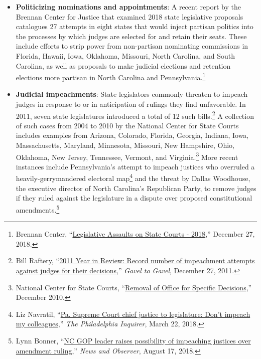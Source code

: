 \documentclass[12pt]{article}
\begin{document}
\begin{itemize}

\item \textbf{Politicizing nominations and appointments}: A recent report by the Brennan Center for Justice that examined 2018 state legislative proposals catalogues 27 attempts in eight states that would inject partisan politics into the processes by which judges are selected for and retain their seats. These include efforts to strip power from non-partisan nominating commissions in Florida, Hawaii, Iowa, Oklahoma, Missouri, North Carolina, and South Carolina, as well as proposals to make judicial elections and retention elections more partisan in North Carolina and Pennsylvania.\footnote{Brennan Center, ``\href{https://www.brennancenter.org/analysis/legislative-assaults-state-courts-2018}{Legislative Assaults on State Courts - 2018},'' December 27, 2018.}

\item \textbf{Judicial impeachments}: State legislators commonly threaten to impeach judges in response to or in anticipation of rulings they find unfavorable. In 2011, seven state legislatures introduced a total of 12 such bills.\footnote{Bill Raftery, ``\href{http://gaveltogavel.us/2011/12/27/2011-year-in-review-record-number-of-impeachment-attempts-against-judges-for-their-decisions/}{2011 Year in Review: Record number of impeachment attempts against judges for their decisions},'' \emph{Gavel to Gavel}, December 27, 2011.} A collection of such cases from 2004 to 2010 by the National Center for State Courts includes examples from Arizona, Colorado, Florida, Georgia, Indiana, Iowa, Massachusetts, Maryland, Minnesota, Missouri, New Hampshire, Ohio, Oklahoma, New Jersey, Tennessee, Vermont, and Virginia.\footnote{National Center for State Courts, ``\href{https://www.ncsc.org/~/media/Microsites/Files/Gavel\%20to\%20Gavel/archived\%20pdfs/G\%20to\%20G\%20Special\%20Impeachment.ashx}{Removal of Office for Specific Decisions},'' December 2010.} More recent instances include Pennsylvania's attempt to impeach justices who overruled a heavily-gerrymandered electoral map\footnote{Liz Navratil, ``\href{http://www.philly.com/philly/news/politics/state/pennsylvania-supreme-court-chief-justice-impeachment-thomas-saylor-20180322.html}{Pa. Supreme Court chief justice to legislature: Don't impeach my colleagues},'' \emph{The Philadelphia Inquirer}, March 22, 2018.} and the threat by Dallas Woodhouse, the executive director of North Carolina's Republican Party, to remove judges if they ruled against the legislature in a dispute over proposed constitutional amendments.\footnote{Lynn Bonner, ``\href{https://www.newsobserver.com/news/politics-government/article216886935.html}{NC GOP leader raises possibility of impeaching justices over amendment ruling},'' \emph{News and Observer}, August 17, 2018.}


\end{itemize}
\end{document}
